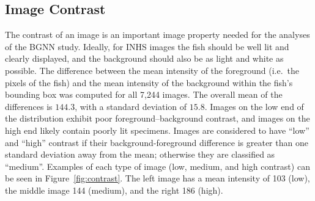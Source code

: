 \documentclass[conference]{IEEEtran}
\begin{document}

\subsection{Image Contrast}
The contrast of an image is an important image property needed
for the analyses of the BGNN study. Ideally, for INHS images the fish should be well lit and clearly displayed, and the background should also be as light and white as possible.
The difference between
the mean intensity of the foreground (i.e.\ the pixels of the fish) and the mean intensity of the background within the fish's bounding box
was computed for all 7,244 images.
The overall mean of the differences is \(144.3\), with a standard deviation of \(15.8\). Images on the low end of the distribution exhibit poor foreground--background contrast, and images on the high end likely contain poorly lit specimens.
Images are considered to have ``low'' and
``high'' contrast if their background-foreground difference is greater than
one standard deviation away from the mean; otherwise they are classified as
``medium''.
Examples of each type of image (low, medium, and high contrast) can be seen in Figure~\ref{fig:contrast}.
The left image has a mean intensity of 103 (low), the middle image 144
(medium), and the right 186 (high).
\end{document}
